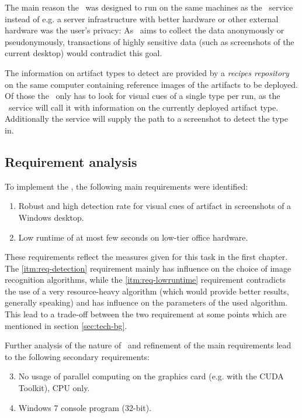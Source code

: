 The main reason the \vd~was designed to run on the same machines as the \ape~service instead of e.g. a server infrastructure with better hardware or other external hardware was the user's privacy:  As \ape~aims to collect the data anonymously or pseudonymously, transactions of highly sensitive data (such as screenshots of the current desktop) would contradict this goal.

The information on artifact types to detect are provided by a \emph{recipes repository} on the same computer containing reference images of the artifacts to be deployed. Of those the \vd~only has to look for visual cues of a single type per run, as the \ape~service will call it with information on the currently deployed artifact type. Additionally the service will supply the path to a screenshot to detect the type in.

\subsection{Requirement analysis}

To implement the \vd, the following main requirements were identified:

\begin{enumerate}
	\item \label{itm:req-detection} Robust and high detection rate for visual cues of artifact in screenshots of a Windows desktop.
	\item \label{itm:req-lowruntime} Low runtime of at most few seconds on low-tier office hardware.
\end{enumerate}

These requirements reflect the measures given for this task in the first chapter. The \ref{itm:req-detection} requirement mainly has influence on the choice of image recognition algorithms, while the \ref{itm:req-lowruntime} requirement contradicts the use of a very resource-heavy algorithm (which would provide better results, generally speaking) and has influence on the parameters of the used algorithm. This lead to a trade-off between the two requirement at some points which are mentioned in section \ref{sec:tech-bg}.

Further analysis of the nature of \ape~and refinement of the main requirements lead to the following secondary requirements:

\begin{enumerate}\setcounter{enumi}{2}
	\item \label{itm:req-nocuda} No usage of parallel computing on the graphics card (e.g. with the CUDA Toolkit\cite{cuda}), CPU only.
	\item \label{itm:req-win7console} Windows 7 console program (32-bit).
\end{enumerate}

